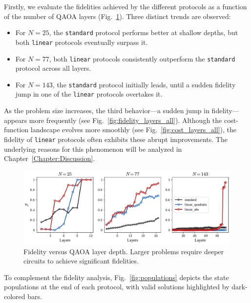 Firstly, we evaluate the fidelities achieved by the different protocols as a function of the number of QAOA layers (Fig.~\ref{fig:fidelity_layers}). Three distinct trends are observed:  
\begin{itemize}
    \item For $N = 25$, the \texttt{standard} protocol performs better at shallow depths, but both \texttt{linear} protocols eventually surpass it.  
    \item For $N = 77$, both \texttt{linear} protocols consistently outperform the \texttt{standard} protocol across all layers.  
    \item For $N = 143$, the \texttt{standard} protocol initially leads, until a sudden fidelity jump in one of the \texttt{linear} protocols overtakes it.  
\end{itemize}

As the problem size increases, the third behavior---a sudden jump in fidelity---appears more frequently (see Fig.~\ref{fig:fidelity_layers_all}). Although the cost-function landscape evolves more smoothly (see Fig.~\ref{fig:cost_layers_all}), the fidelity of \texttt{linear} protocols often exhibits these abrupt improvements. The underlying reasons for this phenomenon will be analyzed in Chapter~\ref{Chapter:Discussion}.

\begin{figure}[h]
    \centering
    \includegraphics[width=1\textwidth]{04-results/figs/fidelity_layers_2577143.pdf}
    \caption{Fidelity versus QAOA layer depth. Larger problems require deeper circuits to achieve significant fidelities.}
    \label{fig:fidelity_layers}
\end{figure}

To complement the fidelity analysis, Fig.~\ref{fig:populations} depicts the state populations at the end of each protocol, with valid solutions highlighted by dark-colored bars.

